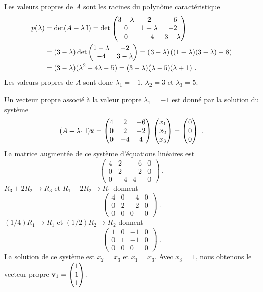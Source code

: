 { Les valeurs propres de $A$ sont les racines du polynôme
caractéristique
\begin{align*}
p(\lambda) &= \det(A -\lambda \operatorname{I})
=\det \begin{pmatrix}
3-\lambda & 2 & -6 \\ 0 & 1-\lambda & -2 \\ 0 & -4 & 3-\lambda
\end{pmatrix} \\
&=(3-\lambda) \det \begin{pmatrix} 1-\lambda & -2 \\  -4 & 3-\lambda
\end{pmatrix}
=(3-\lambda)\left( (1-\lambda)(3-\lambda)-8\right) \\
&= (3-\lambda)(\lambda^2 -4\lambda -5)
= (3-\lambda)(\lambda -5)(\lambda +1) \ .
\end{align*}
Les valeurs propres de $A$ sont donc $\lambda_1 = -1$, $\lambda_2 = 3$
et $\lambda_3 = 5$.

 Un vecteur propre
associé à la valeur propre $\lambda_1 = -1$ est donné par la solution
du système
\[
(A-\lambda_1\operatorname{I})\mathbf{x} = 
\begin{pmatrix}
4 & 2 & -6 \\ 0 & 2 & -2 \\ 0 & -4 & 4
\end{pmatrix}
\begin{pmatrix} x_1 \\ x_2 \\ x_3 \end{pmatrix}
= \begin{pmatrix} 0 \\ 0 \\ 0 \end{pmatrix} \ .
\]
La matrice augmentée de ce système d'équations linéaires est
\[
\left(\begin{array}{ccc|c}
4 & 2 & -6 & 0 \\ 0 & 2 & -2 & 0 \\ 0 & -4 & 4 & 0
\end{array}\right) \ .
\]
$R_3+2R_2 \rightarrow R_3$ et $R_1-2R_2 \rightarrow R_1$ donnent
\[
\left(\begin{array}{ccc|c}
4 & 0 & -4 & 0 \\ 0 & 2 & -2 & 0 \\ 0 & 0 & 0 & 0
\end{array}\right) \ .
\]
$(1/4)R_1 \rightarrow R_1$ et $(1/2)R_2 \rightarrow R_2$ donnent
\[
\left(\begin{array}{ccc|c}
1 & 0 & -1 & 0 \\ 0 & 1 & -1 & 0 \\ 0 & 0 & 0 & 0
\end{array}\right) \ .
\]
La solution de ce système est $x_2=x_3$ et $x_1=x_3$.  Avec $x_3=1$,
nous obtenons le vecteur propre $\displaystyle \mathbf{v}_1 =
\begin{pmatrix} 1 \\ 1 \\ 1 \end{pmatrix}$.

}
